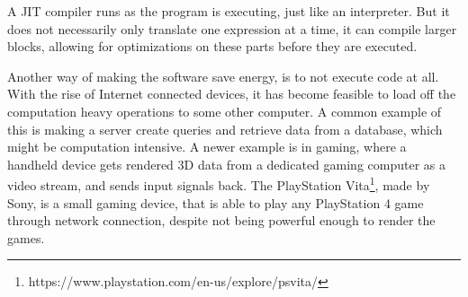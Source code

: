 A JIT compiler runs as the program is executing, just like an interpreter.
But it does not necessarily only translate one expression at a time, it can compile larger blocks, allowing for optimizations on these parts before they are executed.\citep{Aycock:2003:BHJ:857076.857077}


Another way of making the software save energy, is to not execute code at all.
With the rise of Internet connected devices, it has become feasible to load off the computation heavy operations to some other computer.
A common example of this is making a server create queries and retrieve data from a database, which might be computation intensive.
A newer example is in gaming, where a handheld device gets rendered 3D data from a dedicated gaming computer as a video stream, and sends input signals back.
The PlayStation Vita\footnote{https://www.playstation.com/en-us/explore/psvita/}, made by Sony, is a small gaming device, that is able to play any PlayStation 4 game through network connection, despite not being powerful enough to render the games.